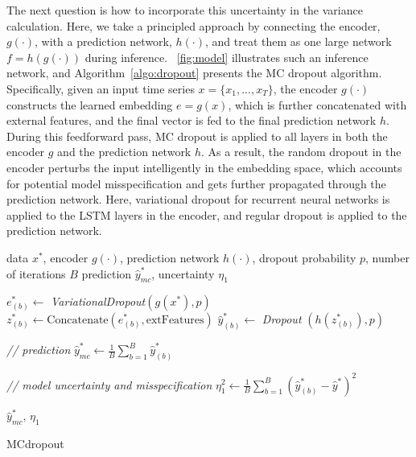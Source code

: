 \documentclass[conference,compsoc,final]{IEEEtran}
\begin{document}
The next question is how to incorporate this uncertainty in the variance calculation. Here, we take a principled approach by connecting the encoder, $g(\cdot)$, with a prediction network, $h(\cdot)$, and treat them as one large network $f = h(g(\cdot))$ during inference. \figurename~\ref{fig:model} illustrates such an inference network, and Algorithm~\ref{algo:dropout} presents the MC dropout algorithm. Specifically, given an input time series $x = \{x_1, ..., x_T\}$, the encoder $g(\cdot)$ constructs the learned embedding $e = g(x)$, which is further concatenated with external features, and the final vector is fed to the final prediction network $h$. During this feedforward pass, MC dropout is applied to all layers in both the encoder $g$ and the prediction network $h$. As a result, the random dropout in the encoder perturbs the input intelligently in the embedding space, which accounts for potential model misspecification and gets further propagated through the prediction network. Here, variational dropout for recurrent neural networks \cite{Gal2015Theoretically} is applied to the LSTM layers in the encoder, and regular dropout \cite{gal2016dropout} is applied to the prediction network. 

\begin{algorithm}[H]

 \begin{algorithmic}[1]
 \renewcommand{\algorithmicrequire}{\textbf{Input:}}
 \renewcommand{\algorithmicensure}{\textbf{Output:}}
 \REQUIRE data $x^*$, encoder $g(\cdot)$, prediction network $h(\cdot)$, dropout probability $p$, number of iterations $B$
 \ENSURE prediction $\hat{y}^*_{mc}$, uncertainty $\eta_1$
 \\
 \vspace{3pt}

  \STATE $e^*_{(b)} \leftarrow$ {\it VariationalDropout}$(g(x^*), p)$
  \STATE $z^*_{(b)} \leftarrow \textrm{Concatenate}(e^*_{(b)}, \textrm{extFeatures})$
  \STATE $\hat{y}^*_{(b)} \leftarrow $  {\it Dropout} $(h(z^*_{(b)}), p)$
  \ENDFOR
  
  \vspace{3pt}
  \textit{// prediction}
  \STATE $\hat{y}^*_{mc} \leftarrow \frac{1}{B} \sum_{b=1}^B \hat{y}^*_{(b)}$
  
  \vspace{3pt}
  \textit{// model uncertainty and misspecification}
  \STATE $\eta_1^2 \leftarrow  \frac{1}{B} \sum_{b=1}^B (\hat{y}^*_{(b)} - \hat{y}^* )^2$

 \RETURN $\hat{y}^*_{mc}, \, \eta_1$
 \end{algorithmic}
 \caption{MCdropout}
 \label{algo:dropout}
 \end{algorithm}
 
\end{document}
